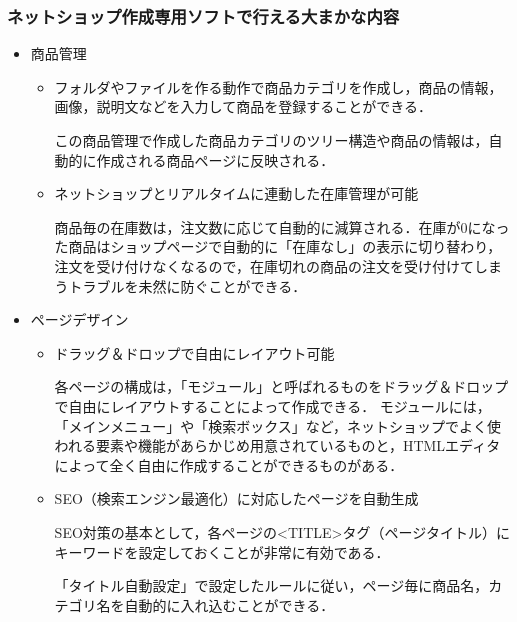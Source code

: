 \subsubsection{ネットショップ作成専用ソフトで行える大まかな内容}

\begin{itemize}

 \item	商品管理

\begin{itemize}
\setlength{\parskip}{3mm}

 \item	フォルダやファイルを作る動作で商品カテゴリを作成し，商品の情報，画像，説明文などを入力して商品を登録することができる．

この商品管理で作成した商品カテゴリのツリー構造や商品の情報は，自動的に作成される商品ページに反映される．

 \item	ネットショップとリアルタイムに連動した在庫管理が可能

商品毎の在庫数は，注文数に応じて自動的に減算される．在庫が0になった商品はショップページで自動的に「在庫なし」の表示に切り替わり，注文を受け付けなくなるので，在庫切れの商品の注文を受け付けてしまうトラブルを未然に防ぐことができる．

\end{itemize}

 \item	ページデザイン

\begin{itemize}
\setlength{\parskip}{3mm}

 \item	ドラッグ＆ドロップで自由にレイアウト可能

各ページの構成は，「モジュール」と呼ばれるものをドラッグ＆ドロップで自由にレイアウトすることによって作成できる．
モジュールには，「メインメニュー」や「検索ボックス」など，ネットショップでよく使われる要素や機能があらかじめ用意されているものと，HTMLエディタによって全く自由に作成することができるものがある．

 \item	SEO（検索エンジン最適化）に対応したページを自動生成

SEO対策の基本として，各ページの<TITLE>タグ（ページタイトル）にキーワードを設定しておくことが非常に有効である．

「タイトル自動設定」で設定したルールに従い，ページ毎に商品名，カテゴリ名を自動的に入れ込むことができる．

\end{itemize}


\end{itemize}
